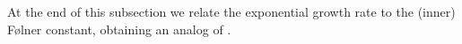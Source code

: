 \documentclass[11 pt, leqno]{amsart}
\newcommand{\ov}{\overline}
\newcommand{\la}{\langle}
\newcommand{\ra}{\rangle}
\newcommand{\ZZ}{\mathbb{Z}}
\newcommand{\wh}{\widehat}
\newcommand{\oon}{\operatorname}
\DeclareMathOperator{\Tr}{Tr}
\theoremstyle{definition}
\numberwithin{equation}{section}
\begin{document}

At the end of this subsection we relate the exponential growth rate to the (inner) F\o lner constant, obtaining an analog of \cite[Proposition 1.4]{Arzhantseva}.
\end{document}
